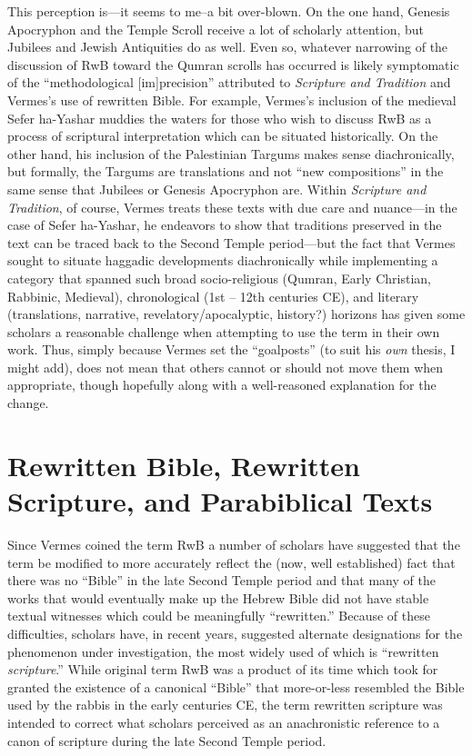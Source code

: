 This perception is---it seems to me--a bit over-blown. On the one hand,
Genesis Apocryphon and the Temple Scroll receive a lot of scholarly
attention, but Jubilees and Jewish Antiquities do as well. Even so,
whatever narrowing of the discussion of RwB toward the Qumran scrolls
has occurred is likely symptomatic of the ``methodological
{[}im{]}precision'' attributed to \emph{Scripture and Tradition} and
Vermes's use of rewritten Bible. For example, Vermes's inclusion of the
medieval Sefer ha-Yashar muddies the waters for those who wish to
discuss RwB as a process of scriptural interpretation which can be
situated historically. On the other hand, his inclusion of the
Palestinian Targums makes sense diachronically, but formally, the
Targums are translations and not ``new compositions'' in the same sense
that Jubilees or Genesis Apocryphon are. Within
\emph{Scripture and Tradition}, of course, Vermes treats these texts
with due care and nuance---in the case of Sefer ha-Yashar, he endeavors
to show that traditions preserved in the text can be traced back to the
Second Temple period---but the fact that Vermes sought to situate
haggadic developments diachronically while implementing a category that
spanned such broad socio-religious (Qumran, Early Christian, Rabbinic,
Medieval), chronological (1st -- 12th centuries CE), and literary
(translations, narrative, revelatory/apocalyptic, history?) horizons has
given some scholars a reasonable challenge when attempting to use the
term in their own work. Thus, simply because Vermes set the
``goalposts'' (to suit his \emph{own} thesis, I might add), does not
mean that others cannot or should not move them when appropriate, though
hopefully along with a well-reasoned explanation for the change.

\section{Rewritten Bible, Rewritten Scripture, and Parabiblical
Texts}\label{rwb-rewritten-scripture-and-parabiblical-texts}

Since Vermes coined the term RwB a number of scholars have suggested
that the term be modified to more accurately reflect the (now, well
established) fact that there was no ``Bible'' in the late Second Temple
period and that many of the works that would eventually make up the
Hebrew Bible did not have stable textual witnesses which could be
meaningfully ``rewritten.'' Because of these difficulties, scholars
have, in recent years, suggested alternate designations for the
phenomenon under investigation, the most widely used of which is
``rewritten \emph{scripture}.'' While original term RwB was a product of
its time which took for granted the existence of a canonical ``Bible''
that more-or-less resembled the Bible used by the rabbis in the early
centuries CE, the term rewritten scripture was intended to correct what
scholars perceived as an anachronistic reference to a canon of scripture
during the late Second Temple
period.\autocites[58--59]{campbell_zsengeller2014}[See
also][]{ulrich_mcdonald-sanders2002}[and][]{ulrich_zsengeller2014}

